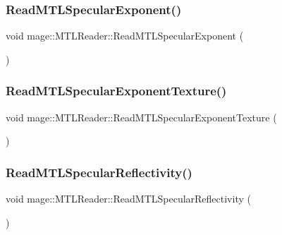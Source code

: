 \hypertarget{classmage_1_1_m_t_l_reader_a0ac9c6202ff7fa921d551e1aaa59b33f}{}\label{classmage_1_1_m_t_l_reader_a0ac9c6202ff7fa921d551e1aaa59b33f} 
\subsubsection{\texorpdfstring{Read\+M\+T\+L\+Specular\+Exponent()}{ReadMTLSpecularExponent()}}
{\footnotesize\ttfamily void mage\+::\+M\+T\+L\+Reader\+::\+Read\+M\+T\+L\+Specular\+Exponent (\begin{DoxyParamCaption}{ }\end{DoxyParamCaption})\hspace{0.3cm}{\ttfamily [private]}}

\hypertarget{classmage_1_1_m_t_l_reader_a9b68187f940dc05a5d86527843f09d18}{}\label{classmage_1_1_m_t_l_reader_a9b68187f940dc05a5d86527843f09d18} 
\subsubsection{\texorpdfstring{Read\+M\+T\+L\+Specular\+Exponent\+Texture()}{ReadMTLSpecularExponentTexture()}}
{\footnotesize\ttfamily void mage\+::\+M\+T\+L\+Reader\+::\+Read\+M\+T\+L\+Specular\+Exponent\+Texture (\begin{DoxyParamCaption}{ }\end{DoxyParamCaption})\hspace{0.3cm}{\ttfamily [private]}}

\hypertarget{classmage_1_1_m_t_l_reader_aa90f43e397bc5fc277b936bdeff4e672}{}\label{classmage_1_1_m_t_l_reader_aa90f43e397bc5fc277b936bdeff4e672} 
\subsubsection{\texorpdfstring{Read\+M\+T\+L\+Specular\+Reflectivity()}{ReadMTLSpecularReflectivity()}}
{\footnotesize\ttfamily void mage\+::\+M\+T\+L\+Reader\+::\+Read\+M\+T\+L\+Specular\+Reflectivity (\begin{DoxyParamCaption}{ }\end{DoxyParamCaption})\hspace{0.3cm}{\ttfamily [private]}}

